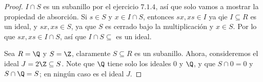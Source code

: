 \begin{problem}[20]
\end{problem}

\begin{proof}
    $I \cap S$ es un subanillo por el ejercicio $7.1.4$, así que solo vamos a mostrar la propiedad de absorción. Si $s \in S$ y $x \in I \cap S$, entonces $sx,xs \in I$ ya qie $I \subseteq R$ es un ideal, y $sx, xs \in S$, ya que $S$ es cerrado bajo la multiplicación y $x \in S$. Por lo que $sx, xs \in I \cap S$, así que $I \cap S \subseteq$ es un ideal.

    Sea $R=\Q$ y $S=\Z$, claramente $S \subseteq R$ es un subanillo. Ahora, consideremos el ideal $J = 2\Z \subseteq S$. Note que $\Q$ tiene solo los ideales $0$ y $\Q$, y que $S \cap 0 = 0$ y $S \cap \Q = S$; en ningún caso es el ideal $J$. 
\end{proof}